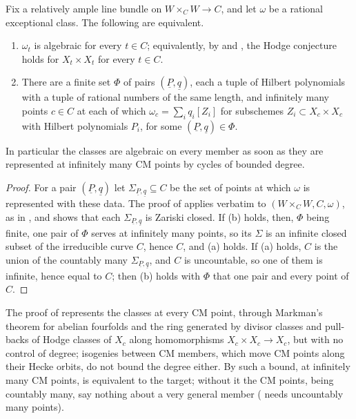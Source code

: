 \begin{corollary}\label{cor:mumfordbounded}
Fix a relatively ample line bundle on $W\times_{C}W\to C$, and let $\omega$ be
a rational exceptional class. The following are equivalent.
\begin{enumerate}[label=\textup{(\alph*)},leftmargin=2.6em,itemsep=2pt]
\item $\omega_{t}$ is algebraic for every $t\in C$; equivalently, by
   and , the Hodge conjecture
  holds for $X_{t}\times X_{t}$ for every $t\in C$.
\item There are a finite set $\Phi$ of pairs $(\underline{P},\underline{q})$,
  each a tuple of Hilbert polynomials with a tuple of rational numbers of the
  same length, and infinitely many points $c\in C$ at each of which
  $\omega_{c}=\sum_{i}q_{i}[Z_{i}]$ for subschemes $Z_{i}\subset X_{c}\times
  X_{c}$ with Hilbert polynomials $P_{i}$, for some $(\underline{P},
  \underline{q})\in\Phi$.
\end{enumerate}
In particular the classes are algebraic on every member as soon as they are
represented at infinitely many CM points by cycles of bounded degree.
\end{corollary}

\begin{proof}
For a pair $(\underline{P},\underline{q})$ let $\Sigma_{\underline{P},
\underline{q}}\subseteq C$ be the set of points at which $\omega$ is
represented with these data. The proof of  applies
verbatim to $(W\times_{C}W,C,\omega)$, as in , and shows
that each $\Sigma_{\underline{P},\underline{q}}$ is Zariski closed. If (b)
holds, then, $\Phi$ being finite, one pair of $\Phi$ serves at infinitely
many points, so its $\Sigma$ is an infinite closed subset of the irreducible
curve $C$, hence $C$, and (a) holds. If (a) holds, $C$ is the union of the
countably many $\Sigma_{\underline{P},\underline{q}}$, and $C$ is
uncountable, so one of
them is infinite, hence equal to $C$; then (b) holds with $\Phi$ that one
pair and every point of $C$.
\end{proof}

The proof of  represents the classes at every CM point,
through Markman's theorem for abelian fourfolds \cite{Mar25a} and the ring
generated by divisor classes and pull-backs of Hodge classes of $X_{c}$ along
homomorphisms $X_{c}\times X_{c}\to X_{c}$, but with no control of degree;
isogenies between CM members, which move CM points along their Hecke orbits,
do not bound the degree either. By
 such a bound, at infinitely many CM points, is
equivalent to the target; without it the CM points, being countably many,
say nothing about a very general member ( needs
uncountably many points).

